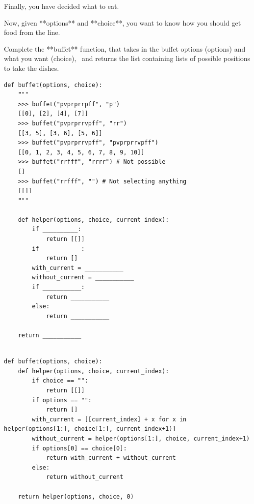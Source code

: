 \begin{blocksection}
\question
Finally, you have decided what to eat.

Now, given **options** and **choice**, you want to know how you should get food from the line.

Complete the **buffet** function, that takes in the buffet options (options) and what you want (choice), \
and returns the list containing lists of possible positions to take the dishes.

\begin{lstlisting}
def buffet(options, choice):
    """
    >>> buffet("pvprprrpff", "p")
    [[0], [2], [4], [7]]
    >>> buffet("pvprprrvpff", "rr")
    [[3, 5], [3, 6], [5, 6]]
    >>> buffet("pvprprrvpff", "pvprprrvpff")
    [[0, 1, 2, 3, 4, 5, 6, 7, 8, 9, 10]]
    >>> buffet("rrfff", "rrrr") # Not possible
    []
    >>> buffet("rrfff", "") # Not selecting anything
    [[]]
    """

    def helper(options, choice, current_index):
        if __________:
            return [[]]
        if ___________:
            return []
        with_current = ___________
        without_current = ___________
        if ___________:
            return ___________
        else:
            return ___________
    
    return ___________
    
\end{lstlisting}
\end{blocksection}

\begin{blocksection}
\begin{solution}
\begin{lstlisting}
def buffet(options, choice):
    def helper(options, choice, current_index):
        if choice == "":
            return [[]]
        if options == "":
            return []
        with_current = [[current_index] + x for x in helper(options[1:], choice[1:], current_index+1)]
        without_current = helper(options[1:], choice, current_index+1)
        if options[0] == choice[0]:
            return with_current + without_current
        else:
            return without_current    
    
    return helper(options, choice, 0)
\end{lstlisting}
\end{solution}
\end{blocksection}